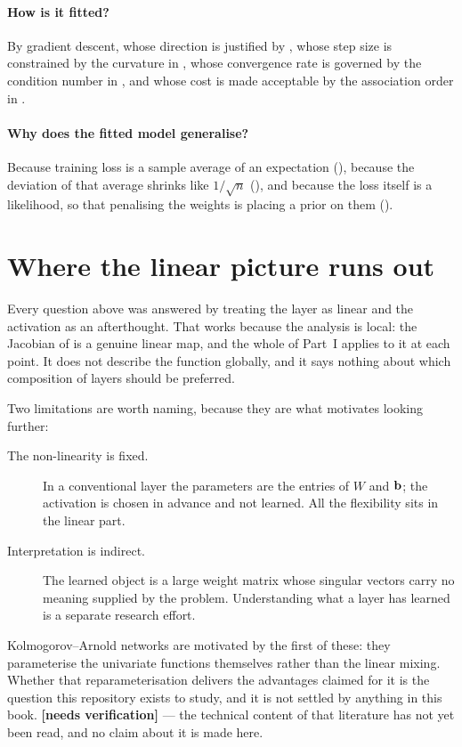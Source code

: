 \paragraph{How is it fitted?}
By gradient descent, whose direction is justified by , whose
step size is constrained by the curvature in , whose convergence
rate is governed by the condition number in , and whose cost
is made acceptable by the association order in .

\paragraph{Why does the fitted model generalise?}
Because training loss is a sample average of an expectation
(), because the deviation of that average shrinks like \(1/\sqrt n\)
(), and because the loss itself is a likelihood, so that penalising
the weights is placing a prior on them ().

\section{Where the linear picture runs out}

Every question above was answered by treating the layer as linear and the
activation as an afterthought. That works because the analysis is local: the
Jacobian of  is a genuine linear map, and the whole of
Part~I applies to it at each point. It does not describe the function globally,
and it says nothing about which composition of layers should be preferred.

Two limitations are worth naming, because they are what motivates looking
further:

\begin{description}
	\item[The non-linearity is fixed.] In a conventional layer the parameters
	are the entries of \(W\) and \(\mathbf{b}\); the activation is chosen in
	advance and not learned. All the flexibility sits in the linear part.
	\item[Interpretation is indirect.] The learned object is a large weight
	matrix whose singular vectors carry no meaning supplied by the problem.
	Understanding what a layer has learned is a separate research effort.
\end{description}

\begin{remark}
Kolmogorov--Arnold networks are motivated by the first of these: they
parameterise the univariate functions themselves rather than the linear mixing.
Whether that reparameterisation delivers the advantages claimed for it is the
question this repository exists to study, and it is not settled by anything in
this book. \textbf{[needs verification]} --- the technical content of that
literature has not yet been read, and no claim about it is made here.
\end{remark}

